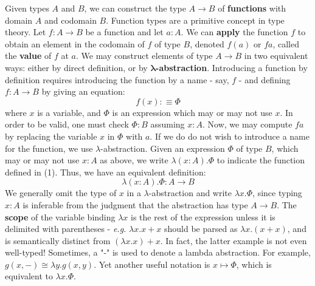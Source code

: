 \documentclass[letterpaper, 10 pt, conference]{ieeeconf}  %
\begin{document}
Given types $A$ and $B$, we can construct the type $A \rightarrow B$ of \textbf{functions} with domain $A$ and codomain $B$. Function types are a primitive concept in type theory. Let $f: A \rightarrow B$ be a function and let $a : A$. We can \textbf{apply} the function $f$ to obtain an element in the codomain of $f$ of type $B$, denoted $f(a)$ or $f a$, called the \textbf{value} of $f$ at $a$. We may construct elements of type $A \rightarrow B$ in two equivalent ways: either by direct definition, or by $\mathbf{\lambda}$\textbf{-abstraction}. Introducing a function by definition requires introducing the function by a name - say, $f$ - and defining $f: A \rightarrow B$ by giving an equation:
\begin{equation}
    f(x) : \equiv \Phi
\end{equation}
where $x$ is a variable, and $\Phi$ is an expression which may or may not use $x$. In order to be valid, one must check $\Phi : B$ assuming $x : A$. Now, we may compute $f a$ by replacing the variable $x$ in $\Phi$ with $a$. If we do do not wish to introduce a name for the function, we use $\lambda$-abstraction. Given an expression $\Phi$ of type $B$, which may or may not use $x : A$ as above, we write $\lambda (x : A). \Phi$ to indicate the function defined in (1). Thus, we have an equivalent definition:
\begin{equation}
    \lambda (x : A). \Phi : A \rightarrow B
\end{equation}
We generally omit the type of $x$ in a $\lambda$-abstraction  and write $\lambda x. \Phi$, since typing $x : A$ is inferable from the judgment that the abstraction has type $A \rightarrow B$. The \textbf{scope} of the variable binding $\lambda x$ is the rest of the expression unless it is delimited with parentheses - \textit{e.g.} $\lambda x. x + x$ should be parsed as $\lambda x. (x + x)$, and is semantically distinct from $(\lambda x. x) + x$. In fact, the latter example is not even well-typed! Sometimes, a "-" is used to denote a lambda abstraction. For example, $g(x, -) \cong \lambda y. g (x, y)$. Yet another useful notation is $x \mapsto \Phi$, which is equivalent to $\lambda x. \Phi$.
\end{document}
